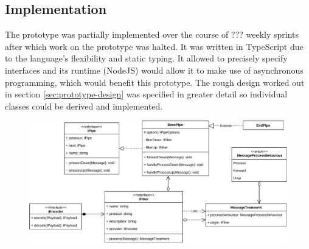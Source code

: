 \subsection{Implementation}
The prototype was partially implemented over the course of ???%
weekly sprints after which work on the prototype was halted. It was written in TypeScript due to the language's flexibility and static typing. It allowed to precisely specify interfaces and its runtime (NodeJS) would allow it to make use of asynchronous programming, which would benefit this prototype. The rough design worked out in section \ref{sec:prototype-design} was specified in greater detail so individual classes could be derived and implemented.\par
\begin{figure}[h]
    \centering
    \includegraphics[width=14cm]{img/ch04/prototype/pipe-filter.pdf}
    \label{fig:prototype-pipe-filter}
\end{figure}

